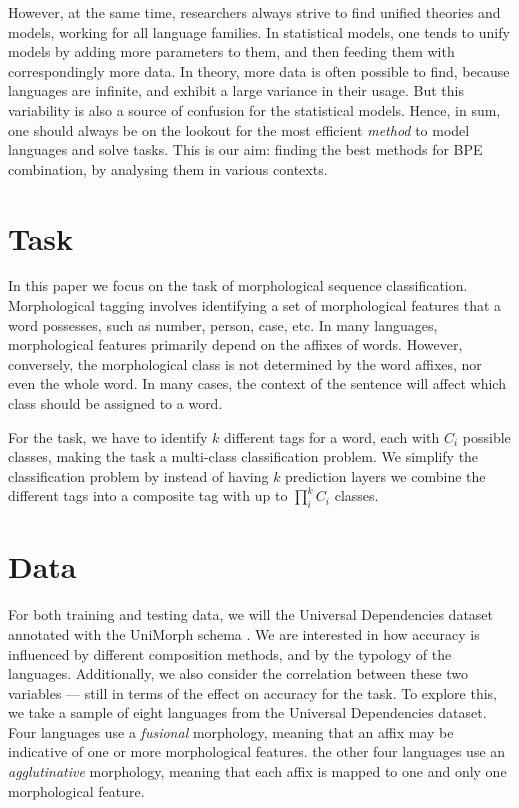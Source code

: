 \documentclass[11pt]{article}
\newcommand\citep{\cite}
\begin{document}
     However, at the same time, researchers always strive
     to find unified theories and models, working for all language
     families.
     In statistical models, one tends to unify models by adding more
     parameters to them, and then feeding them with correspondingly
     more data.  In theory, more data is often possible to find,
     because languages are infinite, and exhibit a large variance in
     their usage. But this variability is also a source of confusion
     for the statistical models. Hence, in sum, one should always be
     on the lookout for the most efficient \emph{method} to model
     languages and solve tasks. This is our aim: finding the best
     methods for BPE combination, by analysing them in various
     contexts.

    \section{Task}
             In this paper we focus on the task of
     morphological sequence classification. Morphological tagging
     involves identifying a set of morphological features that a word
     possesses, such as number, person, case, etc. In many languages,
     morphological features primarily depend on the affixes of
     words. However, conversely, the morphological class is not
     determined by the word affixes, nor even the whole word. In many
     cases, the context of the sentence will affect which class should
     be assigned to a word.

     For the task, we have to identify $k$ different tags for a word,
     each with $C_i$ possible classes, making the task a multi-class
     classification problem. We simplify the classification problem by
     instead of having $k$ prediction layers we combine the different
     tags into a composite tag with up to $\prod _i^k C_i$ classes.

    \section{Data}
    
    For both training and testing data, we will the Universal
    Dependencies dataset \citep{nivre2018} annotated with the UniMorph
    schema \citep{mccarthy2018marrying}. We are interested in how
    accuracy is influenced by different composition methods, and by
    the typology of the languages. Additionally, we also consider the
    correlation between these two variables --- still in terms of the
    effect on accuracy for the task. To explore this, we take a sample
    of eight languages from the Universal Dependencies dataset. Four
    languages use a \textit{fusional} morphology, meaning that an
    affix may be indicative of one or more morphological features. the
    other four languages use an \textit{agglutinative} morphology,
    meaning that each affix is mapped to one and only one
    morphological feature.
\end{document}
